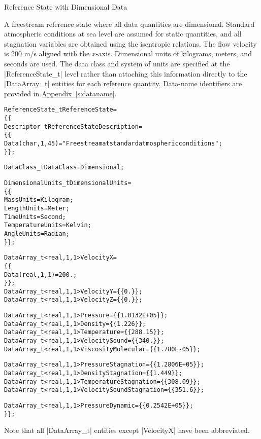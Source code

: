 \begin{example}{Reference State with Dimensional Data}

A freestream reference state where all data quantities are dimensional.
Standard atmospheric conditions at sea level are assumed for static
quantities, and all stagnation variables are obtained using the
isentropic relations.
The flow velocity is 200 m/s aligned with the $x$-axis.
Dimensional units of kilograms, meters, and seconds are used.
The data class and system of units are specified at the
|ReferenceState_t| level rather than attaching this information directly
to the |DataArray_t| entities for each reference quantity.
Data-name identifiers are provided in
\hyperref[s:dataname]{Appendix~\ref*{s:dataname}}.
\begin{alltt}
  ReferenceState\_t ReferenceState = 
    \{\{
    Descriptor\_t ReferenceStateDescription = 
      \{\{
      Data(char, 1, 45) = "Freestream at standard atmospheric conditions" ;
      \}\} ;
    
    DataClass\_t DataClass = Dimensional ;

    DimensionalUnits\_t DimensionalUnits = 
      \{\{
      MassUnits        = Kilogram ;
      LengthUnits      = Meter ;
      TimeUnits        = Second ;
      TemperatureUnits = Kelvin ;
      AngleUnits       = Radian ;
      \}\} ;

    DataArray\_t<real, 1, 1> VelocityX = 
      \{\{
      Data(real, 1, 1) = 200. ;
      \}\} ;
    DataArray\_t<real, 1, 1> VelocityY               = \{\{ 0. \}\} ;
    DataArray\_t<real, 1, 1> VelocityZ               = \{\{ 0. \}\} ;

    DataArray\_t<real, 1, 1> Pressure                = \{\{ 1.0132E+05 \}\} ;
    DataArray\_t<real, 1, 1> Density                 = \{\{ 1.226 \}\} ;
    DataArray\_t<real, 1, 1> Temperature             = \{\{ 288.15 \}\} ;
    DataArray\_t<real, 1, 1> VelocitySound           = \{\{ 340. \}\} ;
    DataArray\_t<real, 1, 1> ViscosityMolecular      = \{\{ 1.780E-05 \}\} ;

    DataArray\_t<real, 1, 1> PressureStagnation      = \{\{ 1.2806E+05 \}\} ;
    DataArray\_t<real, 1, 1> DensityStagnation       = \{\{ 1.449 \}\} ;
    DataArray\_t<real, 1, 1> TemperatureStagnation   = \{\{ 308.09 \}\} ;
    DataArray\_t<real, 1, 1> VelocitySoundStagnation = \{\{ 351.6 \}\} ;

    DataArray\_t<real, 1, 1> PressureDynamic         = \{\{ 0.2542E+05 \}\} ;
    \}\} ;                        
\end{alltt}
Note that all |DataArray_t| entities except |VelocityX| have been
abbreviated.
\end{example}

